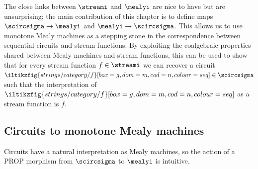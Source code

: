 \documentclass{lmcs}
\begin{document}
The close links between \(\streami\) and \(\mealyi\) are nice to have but are
unsurprising; the main contribution of this chapter is to define maps
\(\scircsigma \to \mealyi\) and \(\mealyi \to \scircsigma\).
This allows us to use monotone Mealy machines as a stepping stone in the
correspondence between sequential circuits and stream functions.
By exploiting the coalgebraic properties shared between Mealy machines and
stream functions, this can be used to show that for every stream function
\(f \in \streami\) we can recover a circuit \(
\iltikzfig{strings/category/f}[box=g,dom=m,cod=n,colour=seq]
\in \scircsigma
\) such that the interpretation of \(
\iltikzfig{strings/category/f}[box=g,dom=m,cod=n,colour=seq]\) as a stream
function is \(f\).

\subsection{Circuits to monotone Mealy machines}

Circuits have a natural interpretation as Mealy machines, so the action
of a PROP morphism from \(\scircsigma\) to \(\mealyi\) is intuitive.
\end{document}
